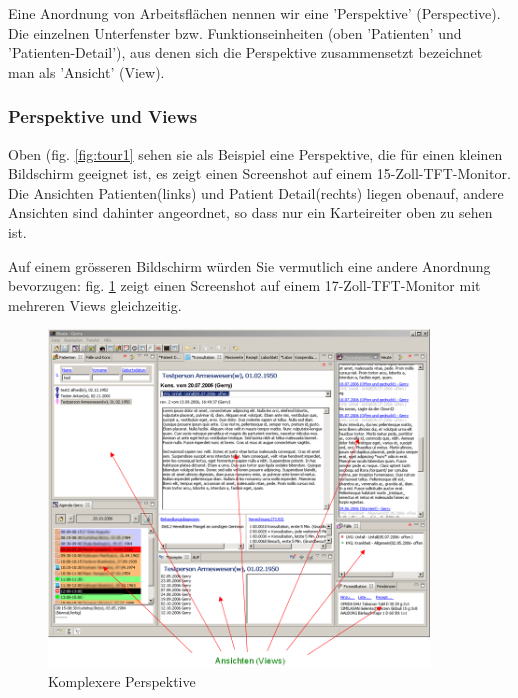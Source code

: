 Eine Anordnung von Arbeitsflächen nennen wir eine 'Perspektive' (Perspective). Die einzelnen Unterfenster bzw. Funktionseinheiten (oben 'Patienten' und 'Patienten-Detail'), aus denen sich die Perspektive zusammensetzt bezeichnet man als 'Ansicht' (View).

\subsubsection{Perspektive und Views}

Oben (fig. \ref{fig:tour1} sehen sie als Beispiel eine Perspektive, die für
einen kleinen Bildschirm geeignet ist, es zeigt einen
Screenshot auf einem 15-Zoll-TFT-Monitor. Die Ansichten \glqq
Patienten\grqq{}(links) und \glqq Patient Detail\grqq{}(rechts) liegen obenauf,
andere Ansichten sind dahinter angeordnet, so dass nur ein Karteireiter oben
zu sehen ist.

Auf einem grösseren Bildschirm würden Sie vermutlich eine andere Anordnung
bevorzugen: fig. \ref{fig:tour2} zeigt einen Screenshot auf einem
17-Zoll-TFT-Monitor mit mehreren Views gleichzeitig.

\begin{figure}[htp]
\begin{center}
  \includegraphics[width=0.9\textwidth]{images/tour2}
  \caption{Komplexere Perspektive}
  \label{fig:tour2}
\end{center}
\end{figure}

